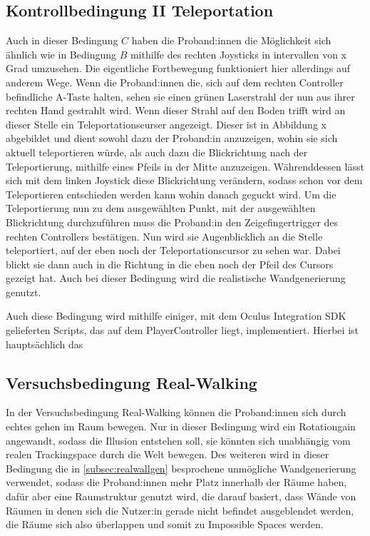         \subsection{Kontrollbedingung II Teleportation}\label{subsec:teleport}
            Auch in dieser Bedingung $C$ haben die Proband:innen die Möglichkeit sich ähnlich wie in Bedingung $B$ mithilfe des rechten Joysticks in intervallen von x Grad%
            umzusehen. Die eigentliche Fortbewegung funktioniert hier allerdings auf anderem Wege. Wenn die Proband:innen die, sich auf dem rechten Controller befindliche
            A-Taste halten, sehen sie einen grünen Laserstrahl der nun aus ihrer rechten Hand gestrahlt wird.
            Wenn dieser Strahl auf den Boden trifft wird an dieser Stelle ein Teleportationscurser angezeigt. Dieser ist in Abbildung x %
            abgebildet und dient sowohl dazu der Proband:in anzuzeigen, wohin sie sich aktuell teleportieren würde, als auch dazu die Blickrichtung nach der Teleportierung, mithilfe eines Pfeils in der Mitte anzuzeigen. Währenddessen lässt sich mit dem linken Joystick diese Blickrichtung verändern, sodass schon vor dem Teleportieren entschieden werden kann wohin danach geguckt wird. Um die Teleportierung nun zu dem ausgewählten Punkt, mit der ausgewählten Blickrichtung durchzuführen muss die Proband:in den Zeigefingertrigger des rechten Controllers bestätigen.
            Nun wird sie Augenblicklich an die Stelle teleportiert, auf der eben noch der Teleportationscursor zu sehen war. Dabei blickt sie dann auch in die Richtung in die eben noch der Pfeil des Cursors gezeigt hat.
            Auch bei dieser Bedingung wird die realistische Wandgenerierung genutzt.

            Auch diese Bedingung wird mithilfe einiger, mit dem Oculus Integration SDK gelieferten Scripts, das auf dem PlayerController liegt, implementiert. Hierbei ist hauptsächlich das \textquote{} %

        \subsection{Versuchsbedingung Real-Walking}\label{subsec:realwalk}
            In der Versuchsbedingung Real-Walking können die Proband:innen sich durch echtes gehen im Raum bewegen. Nur in dieser Bedingung wird ein Rotationgain angewandt, sodass die Illusion entstehen soll, sie könnten sich unabhängig vom realen Trackingspace durch die Welt bewegen.
            Des weiteren wird in dieser Bedingung die in \autoref{subsec:realwallgen} besprochene unmögliche Wandgenerierung verwendet, sodass die Proband:innen mehr Platz innerhalb der Räume haben, dafür aber eine Raumstruktur genutzt wird, die darauf basiert, dass Wände von Räumen in denen sich die Nutzer:in gerade nicht befindet ausgeblendet werden, die Räume sich also überlappen und somit zu Impossible Spaces werden.

